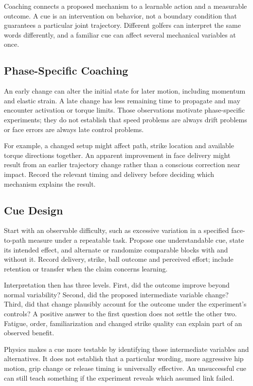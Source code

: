 Coaching connects a proposed mechanism to a learnable action and a measurable outcome. A cue is an intervention on behavior, not a boundary condition that guarantees a particular joint trajectory. Different golfers can interpret the same words differently, and a familiar cue can affect several mechanical variables at once.

\subsection{Phase-Specific Coaching}

An early change can alter the initial state for later motion, including momentum and elastic strain. A late change has less remaining time to propagate and may encounter activation or torque limits. Those observations motivate phase-specific experiments; they do not establish that speed problems are always drift problems or face errors are always late control problems.

For example, a changed setup might affect path, strike location and available torque directions together. An apparent improvement in face delivery might result from an earlier trajectory change rather than a conscious correction near impact. Record the relevant timing and delivery before deciding which mechanism explains the result.

\subsection{Cue Design}
\label{ex:ch13:cue_design}

Start with an observable difficulty, such as excessive variation in a specified face-to-path measure under a repeatable task. Propose one understandable cue, state its intended effect, and alternate or randomize comparable blocks with and without it. Record delivery, strike, ball outcome and perceived effort; include retention or transfer when the claim concerns learning.

Interpretation then has three levels. First, did the outcome improve beyond normal variability? Second, did the proposed intermediate variable change? Third, did that change plausibly account for the outcome under the experiment's controls? A positive answer to the first question does not settle the other two. Fatigue, order, familiarization and changed strike quality can explain part of an observed benefit.

Physics makes a cue more testable by identifying those intermediate variables and alternatives. It does not establish that a particular wording, more aggressive hip motion, grip change or release timing is universally effective. An unsuccessful cue can still teach something if the experiment reveals which assumed link failed.

